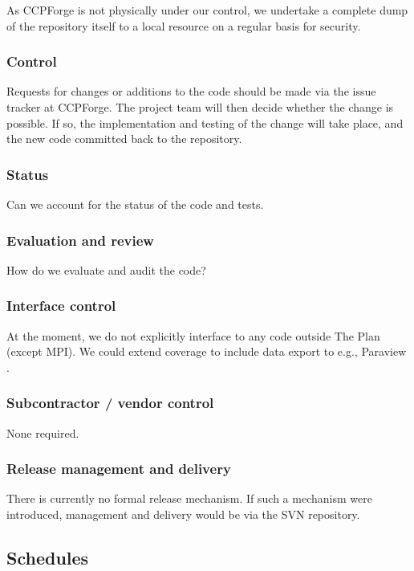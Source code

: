 \documentclass[11pt,twoside]{article}
\begin{document}
As CCPForge is not physically under our control, we undertake a
complete dump of the repository itself to a local resource on a
regular basis for security.

\subsubsection{Control}

Requests for changes or additions to the code should be made via
the issue tracker at CCPForge. The project team will then decide
whether the change is possible. If so, the implementation and
testing of the change will take place, and the new code committed
back to the repository.


\subsubsection{Status}

Can we account for the status of the code and tests.

\subsubsection{Evaluation and review}

How do we evaluate and audit the code?

\subsubsection{Interface control}

At the moment, we do not explicitly interface to any code outside The
Plan (except MPI). We could extend coverage to include data export
to e.g., Paraview \cite{paraview}.

\subsubsection{Subcontractor / vendor control}

None required.

\subsubsection{Release management and delivery}

There is currently no formal release mechanism. If such a mechanism were
introduced, management and  delivery would be via the SVN repository.

\subsection{Schedules}
\end{document}
